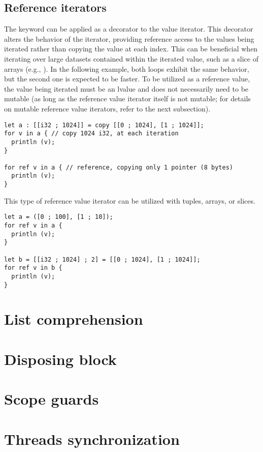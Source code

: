 \subsection{Reference iterators}

The  keyword can be applied as a decorator to the value iterator.
This decorator alters the behavior of the iterator, providing reference access
to the values being iterated rather than copying the value at each index. This
can be beneficial when iterating over large datasets contained within the
iterated value, such as a slice of arrays (e.g., \token{[[c8; 1024]]}). In the
following example, both loops exhibit the same behavior, but the second one is
expected to be faster. To be utilized as a reference value, the value being
iterated must be an lvalue and does not necessarily need to be mutable (as long
as the reference value iterator itself is not mutable; for details on mutable
reference value iterators, refer to the next subsection).

\begin{lstlisting}[style=coloredverbatim]
let a : [[i32 ; 1024]] = copy [[0 ; 1024], [1 ; 1024]];
for v in a { // copy 1024 i32, at each iteration
  println (v);
}

for ref v in a { // reference, copying only 1 pointer (8 bytes)
  println (v);
}
\end{lstlisting}

This type of reference value iterator can be utilized with tuples, arrays, or
slices.

\begin{lstlisting}[style=coloredverbatim]
let a = ([0 ; 100], [1 ; 10]);
for ref v in a {
  println (v);
}

let b = [[i32 ; 1024] ; 2] = [[0 ; 1024], [1 ; 1024]];
for ref v in b {
  println (v);
}
\end{lstlisting}


\section{List comprehension}%
\label{sec:list_compr}

\section{Disposing block}%
\label{sec:with_block}

\section{Scope guards}%
\label{sec:scope_guards}

\section{Threads synchronization}
